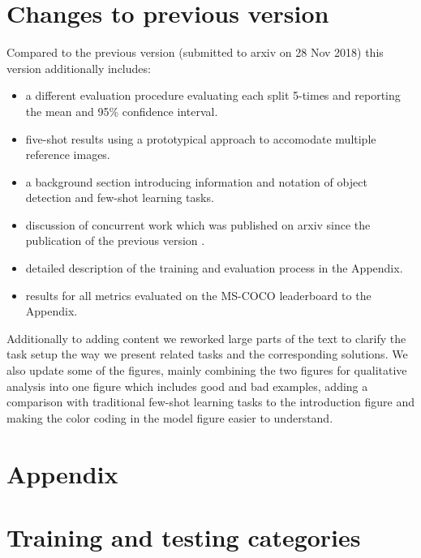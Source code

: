 \documentclass{article}
\newcommand{\coco}{MS-COCO\xspace}
\begin{document}
\clearpage

\section*{Changes to previous version}
Compared to the previous version (submitted to arxiv on 28 Nov 2018) this version additionally includes: 
\begin{itemize}[nosep]
    \item a different evaluation procedure evaluating each split 5-times and reporting the mean and 95\% confidence interval.
    \item five-shot results using a prototypical approach to accomodate multiple reference images.
    \item a background section introducing information and notation of object detection and few-shot learning tasks.
    \item discussion of concurrent work which was published on arxiv since the publication of the previous version \cite{kang2018few, Zhang2019}.
    \item detailed description of the training and evaluation process in the Appendix.
    \item results for all metrics evaluated on the \coco leaderboard to the Appendix.
\end{itemize}
Additionally to adding content we reworked large parts of the text to clarify the task setup the way we present related tasks and the corresponding solutions. We also update some of the figures, mainly combining the two figures for qualitative analysis into one figure which includes good and bad examples, adding a comparison with traditional few-shot learning tasks to the introduction figure and making the color coding in the model figure easier to understand.

\section*{Appendix}
\setcounter{section}{0}
\setcounter{figure}{0}
\setcounter{table}{0}
\renewcommand*{\theHsection}{chX.\the\value{section}}
\renewcommand*{\thesection}{A\the\value{section}}
\renewcommand*{\thefigure}{A\the\value{figure}}
\renewcommand*{\thetable}{A\the\value{table}}

\section{Training and testing categories}
\label{appendix:splits}
\end{document}
